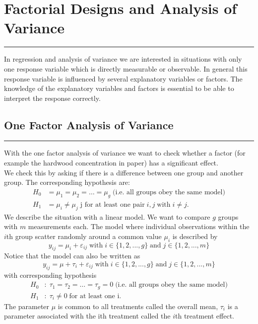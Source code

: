 \section{Factorial Designs and Analysis of Variance}
\noindent\rule[\linienAbstand]{\linewidth}{\linienDickeDick}
In regression and analysis of variance we are interested in situations with only one response variable which is directly measurable or observable. In general this response variable is influenced by several explanatory variables or factors. The knowledge of the explanatory variables and factors is essential to be able to interpret the response correctly.

\subsection{One Factor Analysis of Variance}
\noindent\rule[\linienAbstand]{\linewidth}{\linienDicke}
With the one factor analysis of variance we want to check whether a factor (for example the hardwood concentration in paper) has a significant effect.\\
We check this by asking if there is a difference between one group and another group. The corresponding hypothesis are:
\begin{equation}
  \begin{split}
    H_0 &= \mu_1 = \mu_2 = \dots = \mu_g \; \text{(i.e. all groups obey the same model)}\\
    H_1 &= \mu_i \neq \mu_j \;\text{j for at least one pair}\; i, j \;\text{with}\; i \neq j.
  \end{split}
\end{equation}
We describe the situation with a linear model. We want to compare $g$ groups with $m$ measurements each. The model where individual observations within the $i$th group scatter randomly around a common value $\mu_i$ is described by
\begin{equation}
  y_{ij} = \mu_i + \varepsilon_{ij} \;\text{with}\; i \in \{1, 2, ..., g\} \;\text{and}\; j \in \{1, 2, ...,m\}
\end{equation}
Notice that the model can also be written as
\begin{equation}
  y_{ij} = \mu + \tau_i + \varepsilon_{ij} \;\text{with}\; i \in \{1, 2, ..., g\} \;\text{and}\; j \in \{1, 2, ...,m\}
\end{equation}
with corresponding hypothesis
\begin{equation}
  \begin{split}
    H_0 &: \; \tau_1 = \tau_2 = \dots = \tau_g = 0\; \text{(i.e. all groups obey the same model)}\\
    H_1 &: \; \tau_i \neq 0 \;\text{for at least one i}.
  \end{split}
\end{equation}
The parameter $\mu$ is common to all treatments called the overall mean, $\tau_i$ is a parameter associated with the ith treatment called the $i$th treatment effect.\\

